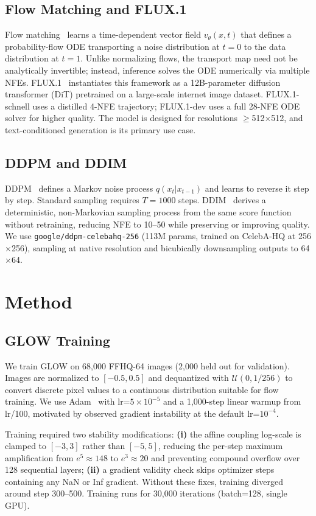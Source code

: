 \documentclass[10pt,twocolumn]{article}
\begin{document}
\subsection{Flow Matching and FLUX.1}
Flow matching~\cite{lipman2022fm} learns a time-dependent vector field $v_\theta(x,t)$ that defines a probability-flow ODE transporting a noise distribution at $t=0$ to the data distribution at $t=1$. Unlike normalizing flows, the transport map need not be analytically invertible; instead, inference solves the ODE numerically via multiple NFEs. FLUX.1~\cite{flux2024} instantiates this framework as a 12B-parameter diffusion transformer (DiT) pretrained on a large-scale internet image dataset. FLUX.1-schnell uses a distilled 4-NFE trajectory; FLUX.1-dev uses a full 28-NFE ODE solver for higher quality. The model is designed for resolutions $\geq$512$\times$512, and text-conditioned generation is its primary use case.

\subsection{DDPM and DDIM}
DDPM~\cite{ho2020ddpm} defines a Markov noise process $q(x_t|x_{t-1})$ and learns to reverse it step by step. Standard sampling requires $T=1000$ steps. DDIM~\cite{song2020ddim} derives a deterministic, non-Markovian sampling process from the same score function without retraining, reducing NFE to 10--50 while preserving or improving quality. We use \texttt{google/ddpm-celebahq-256} (113M params, trained on CelebA-HQ at 256$\times$256), sampling at native resolution and bicubically downsampling outputs to 64$\times$64.

\section{Method}

\subsection{GLOW Training}
We train GLOW on 68,000 FFHQ-64 images (2,000 held out for validation). Images are normalized to $[-0.5,0.5]$ and dequantized with $\mathcal{U}(0,1/256)$ to convert discrete pixel values to a continuous distribution suitable for flow training. We use Adam~\cite{kingma2014adam} with lr=$5\!\times\!10^{-5}$ and a 1,000-step linear warmup from lr/100, motivated by observed gradient instability at the default lr=$10^{-4}$.

Training required two stability modifications: \textbf{(i)} the affine coupling log-scale is clamped to $[-3,3]$ rather than $[-5,5]$, reducing the per-step maximum amplification from $e^5\!\approx\!148$ to $e^3\!\approx\!20$ and preventing compound overflow over 128 sequential layers; \textbf{(ii)} a gradient validity check skips optimizer steps containing any NaN or Inf gradient. Without these fixes, training diverged around step 300--500. Training runs for 30,000 iterations (batch=128, single GPU).
\end{document}
